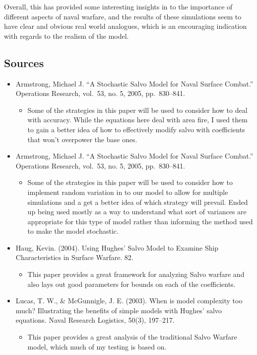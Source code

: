 Overall, this has provided some interesting insights in to the
importance of different aspects of naval warfare, and the results of
these simulations seem to have clear and obvious real world analogues,
which is an encouraging indication with regards to the realism of the
model.

\hypertarget{sources}{%
\subsection{Sources}\label{sources}}

\begin{itemize}
\tightlist
\item
  Armstrong, Michael J. ``A Stochastic Salvo Model for Naval Surface
  Combat.'' Operations Research, vol.~53, no. 5, 2005, pp.~830--841.

  \begin{itemize}
  \tightlist
  \item
    Some of the strategies in this paper will be used to consider how to
    deal with accuracy. While the equations here deal with area fire, I
    used them to gain a better idea of how to effectively modify salvo
    with coefficients that won't overpower the base ones.
  \end{itemize}
\item
  Armstrong, Michael J. ``A Stochastic Salvo Model for Naval Surface
  Combat.'' Operations Research, vol.~53, no. 5, 2005, pp.~830--841.

  \begin{itemize}
  \tightlist
  \item
    Some of the strategies in this paper will be used to consider how to
    implement random variation in to our model to allow for multiple
    simulations and a get a better idea of which strategy will prevail.
    Ended up being used mostly as a way to understand what sort of
    variances are appropriate for this type of model rather than
    informing the method used to make the model stochastic.
  \end{itemize}
\item
  Haug, Kevin. (2004). Using Hughes' Salvo Model to Examine Ship
  Characteristics in Surface Warfare. 82.

  \begin{itemize}
  \tightlist
  \item
    This paper provides a great framework for analyzing Salvo warfare
    and also lays out good parameters for bounds on each of the
    coefficients.
  \end{itemize}
\item
  Lucas, T. W., \& McGunnigle, J. E. (2003). When is model complexity
  too much? Illustrating the benefits of simple models with Hughes'
  salvo equations. Naval Research Logistics, 50(3), 197--217.

  \begin{itemize}
  \tightlist
  \item
    This paper provides a great analysis of the traditional Salvo
    Warfare model, which much of my testing is based on.
  \end{itemize}
\end{itemize}

